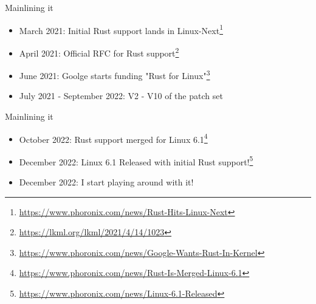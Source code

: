 \begin{frame}[c]{Mainlining it}
  \begin{itemize}
    \item March 2021: Initial Rust support lands in Linux-Next\footnote{\url{https://www.phoronix.com/news/Rust-Hits-Linux-Next}}
    \item April 2021: Official RFC for Rust support\footnote{\url{https://lkml.org/lkml/2021/4/14/1023}}
    \pause \item June 2021: Goolge starts funding "Rust for Linux"\footnote{\url{https://www.phoronix.com/news/Google-Wants-Rust-In-Kernel}}
    \item July 2021 - September 2022: V2 - V10 of the patch set
  \end{itemize}
\end{frame}

\begin{frame}[c]{Mainlining it}
  \begin{itemize}
    \item October 2022: Rust support merged for Linux 6.1\footnote{\url{https://www.phoronix.com/news/Rust-Is-Merged-Linux-6.1}}
    \item December 2022: Linux 6.1 Released with initial Rust support!\footnote{\url{https://www.phoronix.com/news/Linux-6.1-Released}}
    \pause \item December 2022: I start playing around with it!
  \end{itemize}
\end{frame}
